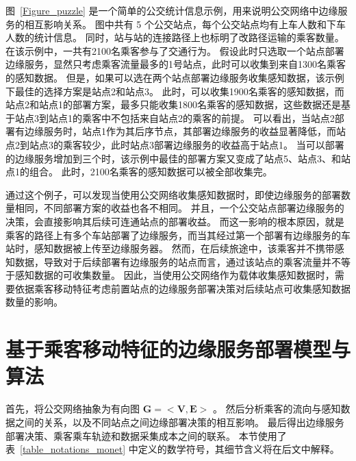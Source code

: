 图~\ref{Figure_puzzle} 是一个简单的公交统计信息示例，用来说明公交网络中边缘服务的相互影响关系。
图中共有 5 个公交站点，每个公交站点均有上车人数和下车人数的统计信息。
同时，站与站的连接路径上也标明了改路径运输的乘客数量。
在该示例中，一共有2100名乘客参与了交通行为。
假设此时只选取一个站点部署边缘服务，显然只考虑乘客流量最多的1号站点，此时可以收集到来自1300名乘客的感知数据。
但是，如果可以选在两个站点部署边缘服务收集感知数据，该示例下最佳的选择方案是站点2和站点3。
此时，可以收集1900名乘客的感知数据，而站点2和站点1的部署方案，最多只能收集1800名乘客的感知数据，这些数据还是基于站点3到站点1的乘客中不包括来自站点2的乘客的前提。
可以看出，当站点2部署有边缘服务时，站点1作为其后序节点，其部署边缘服务的收益显著降低，而站点2到站点3的乘客较少，此时站点3部署边缘服务的收益高于站点1。
当可以部署的边缘服务增加到三个时，该示例中最佳的部署方案又变成了站点5、站点3、和站点1的组合。
此时，2100名乘客的感知数据可以被全部收集完。

通过这个例子，可以发现当使用公交网络收集感知数据时，即使边缘服务的部署数量相同，不同部署方案的收益也各不相同。
并且，一个公交站点部署边缘服务的决策，会直接影响其后续可连通站点的部署收益。
而这一影响的根本原因，就是乘客的路径上有多个车站部署了边缘服务，而当其经过第一个部署有边缘服务的车站时，感知数据被上传至边缘服务器。
然而，在后续旅途中，该乘客并不携带感知数据，导致对于后续部署有边缘服务的站点而言，通过该站点的乘客流量并不等于感知数据的可收集数量。
因此，当使用公交网络作为载体收集感知数据时，需要依据乘客移动特征考虑前置站点的边缘服务部署决策对后续站点可收集感知数据数量的影响。

\section{基于乘客移动特征的边缘服务部署模型与算法}

首先，将公交网络抽象为有向图 $\boldsymbol{G}=<\boldsymbol{V}, \boldsymbol{E}>$ 。
然后分析乘客的流向与感知数据之间的关系，以及不同站点之间边缘部署决策的相互影响。
最后得出边缘服务部署决策、乘客乘车轨迹和数据采集成本之间的联系。
本节使用了表~\ref{table_notations_monet} 中定义的数学符号，其细节含义将在后文中解释。

